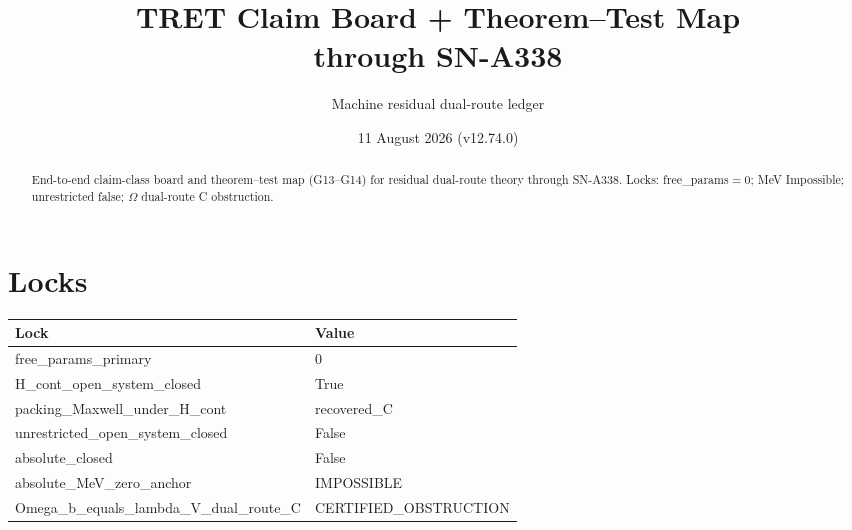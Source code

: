\documentclass[11pt,a4paper]{article}
\title{TRET Claim Board + Theorem--Test Map\\through SN-A338}
\author{Machine residual dual-route ledger}
\date{11 August 2026 (v12.74.0)}
\begin{document}
\maketitle
\begin{abstract}
End-to-end claim-class board and theorem--test map (G13--G14) for residual dual-route theory through SN-A338.
Locks: free\_params${=}0$; MeV Impossible; unrestricted false; $\Omega$ dual-route C obstruction.
\end{abstract}
\section{Locks}
\begin{center}
\begin{tabular}{@{}ll@{}}
\toprule Lock & Value \\
\midrule
free\_params\_primary & 0 \\
H\_cont\_open\_system\_closed & True \\
packing\_Maxwell\_under\_H\_cont & recovered\_C \\
unrestricted\_open\_system\_closed & False \\
absolute\_closed & False \\
absolute\_MeV\_zero\_anchor & IMPOSSIBLE \\
Omega\_b\_equals\_lambda\_V\_dual\_route\_C & CERTIFIED\_OBSTRUCTION \\
\bottomrule
\end{tabular}
\end{center}
\end{document}
